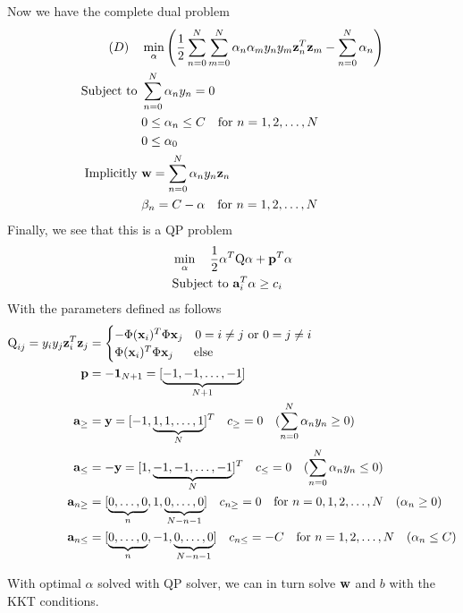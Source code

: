 \documentclass[11pt]{article}
\theoremstyle{definition}
\begin{document}
Now we have the complete dual problem
\begin{align*}
  (D)\quad&\min_{\alpha}\left(\frac{1}{2}\sum^N_{n = 0}\sum^N_{m = 0}\alpha_n\alpha_my_ny_m\vb{z}_n^T\vb{z}_m - \sum^N_{n = 0}\alpha_n\right) \\ 
  \text{Subject to }&\sum^N_{n = 0}\alpha_ny_n = 0 \\
  & 0\leq\alpha_n\leq C  \quad\text{for } n = 1, 2,\dots,N \\ 
  & 0\leq\alpha_0 \\
  \text{Implicitly }&\vb{w} = \sum^N_{n = 0}\alpha_ny_n\vb{z}_n\\ 
  & \beta_n = C - \alpha\quad\text{for } n = 1, 2,\dots,N
\end{align*}
Finally, we see that this is a QP problem
\begin{align*}
  &\min_{\alpha}\quad\frac{1}{2}\alpha^T\text{Q}\alpha + \vb{p}^T\alpha \\ 
  &\text{Subject to }\vb{a}_i^T\alpha \geq c_i
\end{align*}
With the parameters defined as follows
\begin{align*}
  \text{Q}_{ij} = y_iy_j\vb{z}_i^T\vb{z}_j &= 
  \begin{cases}
    -\Phi(\vb{x}_i)^T\Phi{\vb{x}_j} \quad  0 = i \neq j \text{ or }0 = j \neq i \\
    \Phi(\vb{x}_i)^T\Phi{\vb{x}_j} \quad\ \ \text{else}
  \end{cases} \\
  \vb{p} &= -\vb{1}_{N + 1} = [\underbrace{-1, -1,\dots,-1}_{N + 1}] \\ 
  \vb{a}_{\geq} &= \vb{y} = [-1, \underbrace{1, 1, \dots, 1}_{N}]^T\quad c_{\geq} = 0 \quad(\sum^N_{n = 0}\alpha_ny_n \geq 0) \\
  \vb{a}_{\leq} &= -\vb{y} = [1, \underbrace{-1, -1, \dots, -1}_{N}]^T\quad c_{\leq} = 0 \quad (\sum^N_{n = 0}\alpha_ny_n \leq 0) \\
  \vb{a}_{n\geq} &= [\underbrace{0, \dots, 0}_{n}, 1, \underbrace{0, \dots, 0}_{N - n - 1}] \quad c_{n\geq} = 0 \quad\text{for } n = 0, 1, 2,\dots,N\quad (\alpha_n \geq 0) \\
  \vb{a}_{n\leq} &= [\underbrace{0, \dots, 0}_{n}, -1, \underbrace{0, \dots, 0}_{N - n - 1}] \quad c_{n\leq} = -C \quad\text{for } n = 1, 2,\dots,N\quad (\alpha_n \leq C)
\end{align*}
\par 
With optimal $\alpha$ solved with QP solver, we can in turn solve $\vb{w}$ and $b$ with the KKT conditions.
\newpage
\end{document}
